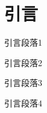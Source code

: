 \newpage

\setcounter{page}{1}

\section{引言}
    引言段落1

    引言段落2

    引言段落3
    
    引言段落4


\setcounter{secnumdepth}{3}



